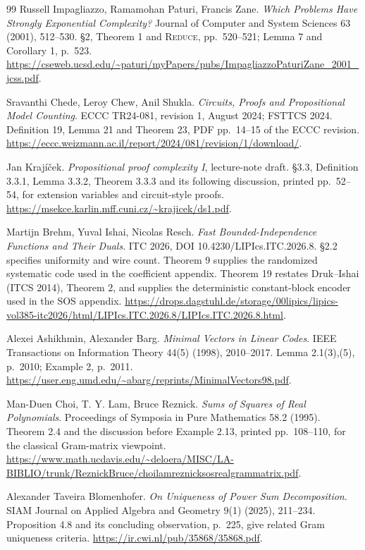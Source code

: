 \documentclass[11pt]{article}
\theoremstyle{definition}
\theoremstyle{remark}
\begin{document}
\begin{thebibliography}{99}
 Russell Impagliazzo, Ramamohan Paturi, Francis Zane.
\emph{Which Problems Have Strongly Exponential Complexity?}
Journal of Computer and System Sciences 63 (2001), 512--530.
\S2, Theorem 1 and \textsc{Reduce}, pp.~520--521;
Lemma 7 and Corollary 1, p.~523.
\url{https://cseweb.ucsd.edu/~paturi/myPapers/pubs/ImpagliazzoPaturiZane_2001_jcss.pdf}.

 Sravanthi Chede, Leroy Chew, Anil Shukla.
\emph{Circuits, Proofs and Propositional Model Counting}.
ECCC TR24-081, revision 1, August 2024; FSTTCS 2024.
Definition 19, Lemma 21 and Theorem 23, PDF pp.~14--15
of the ECCC revision.
\url{https://eccc.weizmann.ac.il/report/2024/081/revision/1/download/}.

 Jan Kraj\'i\v{c}ek. \emph{Propositional proof
complexity I}, lecture-note draft. \S3.3, Definition 3.3.1,
Lemma 3.3.2, Theorem 3.3.3 and its following discussion,
printed pp.~52--54, for extension variables and circuit-style
proofs.
\url{https://msekce.karlin.mff.cuni.cz/~krajicek/ds1.pdf}.

 Martijn Brehm, Yuval Ishai, Nicolas Resch.
\emph{Fast Bounded-Independence Functions and Their Duals}.
ITC 2026, DOI 10.4230/LIPIcs.ITC.2026.8.
\S2.2 specifies uniformity and wire count.
Theorem 9 supplies the randomized systematic code used in
the coefficient appendix. Theorem 19 restates Druk--Ishai
(ITCS 2014), Theorem 2, and supplies the deterministic
constant-block encoder used in the SOS appendix.
\url{https://drops.dagstuhl.de/storage/00lipics/lipics-vol385-itc2026/html/LIPIcs.ITC.2026.8/LIPIcs.ITC.2026.8.html}.

 Alexei Ashikhmin, Alexander Barg.
\emph{Minimal Vectors in Linear Codes}. IEEE Transactions on
Information Theory 44(5) (1998), 2010--2017.
Lemma 2.1(3),(5), p.~2010; Example 2, p.~2011.
\url{https://user.eng.umd.edu/~abarg/reprints/MinimalVectors98.pdf}.

 Man-Duen Choi, T. Y. Lam, Bruce Reznick.
\emph{Sums of Squares of Real Polynomials}. Proceedings of
Symposia in Pure Mathematics 58.2 (1995).
Theorem 2.4 and the discussion before Example 2.13,
printed pp.~108--110, for the classical Gram-matrix viewpoint.
\url{https://www.math.ucdavis.edu/~deloera/MISC/LA-BIBLIO/trunk/ReznickBruce/choilamreznicksosrealgrammatrix.pdf}.

 Alexander Taveira Blomenhofer.
\emph{On Uniqueness of Power Sum Decomposition}.
SIAM Journal on Applied Algebra and Geometry 9(1) (2025),
211--234. Proposition 4.8 and its concluding observation,
p.~225, give related Gram uniqueness criteria.
\url{https://ir.cwi.nl/pub/35868/35868.pdf}.


\end{thebibliography}
\end{document}
